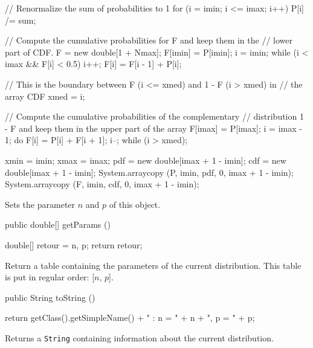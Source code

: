 \begin{code}
\begin{hide}
{      // Renormalize the sum of probabilities to 1
      for (i = imin; i <= imax; i++)
         P[i] /= sum;

      // Compute the cumulative probabilities for F and keep them in the
      // lower part of CDF.
      F = new double[1 + Nmax];
      F[imin] = P[imin];
      i = imin;
      while (i < imax && F[i] < 0.5) {
         i++;
         F[i] = F[i - 1] + P[i];
      }

      // This is the boundary between F (i <= xmed) and 1 - F (i > xmed) in
      // the array CDF
      xmed = i;

      // Compute the cumulative probabilities of the complementary
      // distribution 1 - F and keep them in the upper part of the array
      F[imax] = P[imax];
      i = imax - 1;
      do {
         F[i] = P[i] + F[i + 1];
         i--;
      } while (i > xmed);

     xmin = imin;
     xmax = imax;
     pdf = new double[imax + 1 - imin];
     cdf = new double[imax + 1 - imin];
     System.arraycopy (P, imin, pdf, 0, imax + 1 - imin);
     System.arraycopy (F, imin, cdf, 0, imax + 1 - imin);

   }\end{hide}
\end{code}
\begin{tabb} Sets the parameter $n$ and $p$ of this object.
\end{tabb}
\begin{code}

   public double[] getParams ()\begin{hide} {
      double[] retour = {n, p};
      return retour;
   }\end{hide}
\end{code}
\begin{tabb}
   Return a table containing the parameters of the current distribution.
   This table is put in regular order: [$n$, $p$].
\end{tabb}
\begin{hide}\begin{code}

   public String toString ()\begin{hide} {
      return getClass().getSimpleName() + " : n = " + n + ", p = " + p;
   }\end{hide}
\end{code}
\begin{tabb}
   Returns a \texttt{String} containing information about the current distribution.
\end{tabb}\end{hide}
\begin{code}\begin{hide}
}\end{hide}
\end{code}
